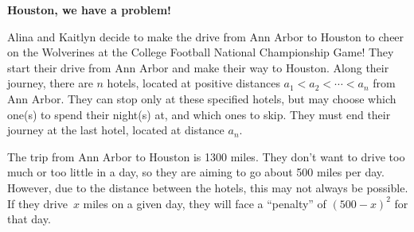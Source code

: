 \documentclass[11pt,addpoints]{exam}
\begin{document}
\begin{questions}
    
  \question \textbf{Houston, we have a problem!}

  Alina and Kaitlyn decide to make the drive from Ann Arbor to Houston to cheer on the Wolverines at the College Football National Championship Game!
  They start their drive from Ann Arbor and make their way to Houston.
  Along their journey, there are $n$ hotels, located at positive distances $a_1 < a_2 < \cdots < a_n$ from Ann Arbor.
  They can stop only at these specified hotels, but may choose which one(s) to spend their night(s) at, and which ones to skip.
  They must end their journey at the last hotel, located at distance $a_n$.

  The trip from Ann Arbor to Houston is 1300 miles.
  They don't want to drive too much or too little in a day, so they are aiming to go about 500 miles per day.
  However, due to the distance between the hotels, this may not always be possible.
  If they drive~$x$ miles on a given day, they will face a ``penalty'' of $(500-x)^2$ for that day.
    

\end{questions}
\end{document}
